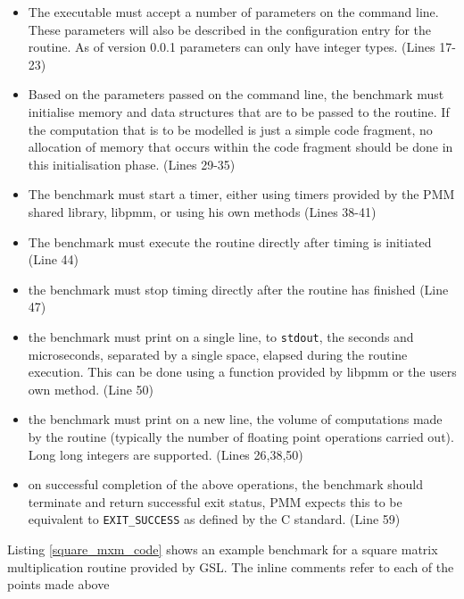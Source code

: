 \documentclass[a4paper,12pt]{report}
\begin{document}
    \begin{itemize}
        \item The executable must accept a number of parameters on the command
            line. These parameters will also be described in the configuration
            entry for the routine. As of version 0.0.1 parameters can only have
            integer types. (Lines 17-23)
        \item Based on the parameters passed on the command line, the benchmark
            must initialise memory and data structures that are to be passed to
            the routine. If the computation that is to be modelled is just a
            simple code fragment, no allocation of memory that occurs within
            the code fragment should be done in this initialisation phase. (Lines 29-35)
        \item The benchmark must start a timer, either using timers provided by
            the PMM shared library, libpmm, or using his own methods (Lines
            38-41)
        \item The benchmark must execute the routine directly after timing is
            initiated (Line 44)
        \item the benchmark must stop timing directly after the routine has
            finished (Line 47)
        \item the benchmark must print on a single line, to \verb+stdout+, the
            seconds and microseconds, separated by a single space, elapsed
            during the routine execution. This can be done using a function
            provided by libpmm or the users own method. (Line 50)
        \item the benchmark must print on a new line, the volume
            of computations made by the routine (typically the number of
            floating point operations carried out). Long long integers are
            supported.  (Lines 26,38,50)
        \item on successful completion of the above operations, the benchmark
            should terminate and return successful exit status, PMM expects
            this to be equivalent to \verb+EXIT_SUCCESS+ as defined by the C
            standard. (Line 59)
    \end{itemize}

    Listing \ref{square_mxm_code} shows an example benchmark for a square
    matrix multiplication routine provided by GSL. The inline comments refer to
    each of the points made above
\end{document}

